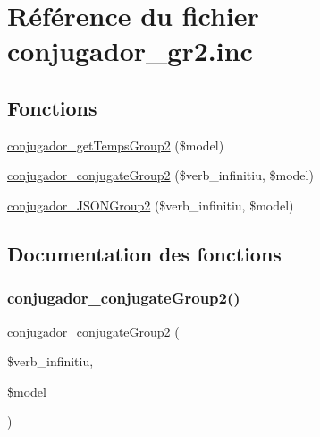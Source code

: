 \hypertarget{conjugador__gr2_8inc}{}\section{Référence du fichier conjugador\+\_\+gr2.\+inc}
\label{conjugador__gr2_8inc}
\subsection*{Fonctions}
\begin{DoxyCompactItemize}
\item 
\hyperlink{conjugador__gr2_8inc_a38e47f1d53f3db71b10d94b080e27190}{conjugador\+\_\+get\+Temps\+Group2} (\$model)
\item 
\hyperlink{conjugador__gr2_8inc_a67fdddf161087db219c66ef23e1062e4}{conjugador\+\_\+conjugate\+Group2} (\$verb\+\_\+infinitiu, \$model)
\item 
\hyperlink{conjugador__gr2_8inc_a23811a826aba996459214db8b2176a60}{conjugador\+\_\+\+J\+S\+O\+N\+Group2} (\$verb\+\_\+infinitiu, \$model)
\end{DoxyCompactItemize}


\subsection{Documentation des fonctions}
\hypertarget{conjugador__gr2_8inc_a67fdddf161087db219c66ef23e1062e4}{}\label{conjugador__gr2_8inc_a67fdddf161087db219c66ef23e1062e4} 
\subsubsection{\texorpdfstring{conjugador\+\_\+conjugate\+Group2()}{conjugador\_conjugateGroup2()}}
{\footnotesize\ttfamily conjugador\+\_\+conjugate\+Group2 (\begin{DoxyParamCaption}\item[{}]{\$verb\+\_\+infinitiu,  }\item[{}]{\$model }\end{DoxyParamCaption})}

\hypertarget{conjugador__gr2_8inc_a38e47f1d53f3db71b10d94b080e27190}{}\label{conjugador__gr2_8inc_a38e47f1d53f3db71b10d94b080e27190} 
